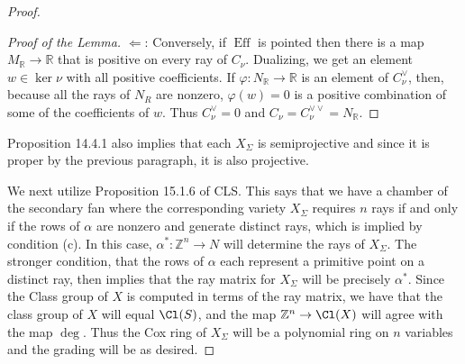 \documentclass[11pt]{amsart}
\numberwithin{equation}{section}
\theoremstyle{definition}
\theoremstyle{remark}
\newcommand{\ZZ}{\mathbb Z}
\newcommand{\QQ}{\mathbb Q}
\newcommand{\RR}{\mathbb R}
\newcommand{\Eff}{\operatorname{Eff}}
\def\phi{\varphi}
\begin{document}
\begin{proof}
\begin{proof}[Proof of the Lemma]
    \noindent $\Leftarrow$: Conversely, if $\Eff$ is pointed then there
    is a map $M_\RR \to \RR$ that is positive on every ray of $C_\nu$. Dualizing, we get an
    element $w \in \ker \nu$ with all positive coefficients. If $\phi: N_\RR \to \RR$
    is an element of $C_\nu^\vee$, then, because all the rays of $N_R$ are nonzero, $\phi(w)=0$ is a positive combination of some of the coefficients of $w$. Thus $C_\nu^\vee = 0$ and $C_\nu = C_\nu^{\vee\vee} = N_\RR$.
    \end{proof}
    

    Proposition 14.4.1 also implies that each $X_{\Sigma}$ is semiprojective and since it is proper by the previous paragraph, it is also projective.
    
   We next utilize Proposition 15.1.6 of CLS.  This says that we have a chamber of the secondary fan where the corresponding variety $X_{\Sigma}$ requires $n$ rays if and only if the rows of $\alpha$ are nonzero and generate distinct rays, which is implied by condition (c).  In this case, $\alpha^*: \ZZ^n\to N$ will determine the rays of $X_{\Sigma}$.  The stronger condition, that the rows of $\alpha$ each represent a primitive point on a distinct ray, then implies that the ray matrix for $X_{\Sigma}$ will be precisely $\alpha^*$.  Since the Class group of $X$ is computed in terms of the ray matrix, we have that the class group of $X$ will equal $\Cl(S)$, and the map $\ZZ^{n}\to \Cl(X)$ will agree with the map $\deg$.  Thus the Cox ring of $X_{\Sigma}$ will be a polynomial ring on $n$ variables and the grading will be as desired.
\end{proof}
\end{document}

